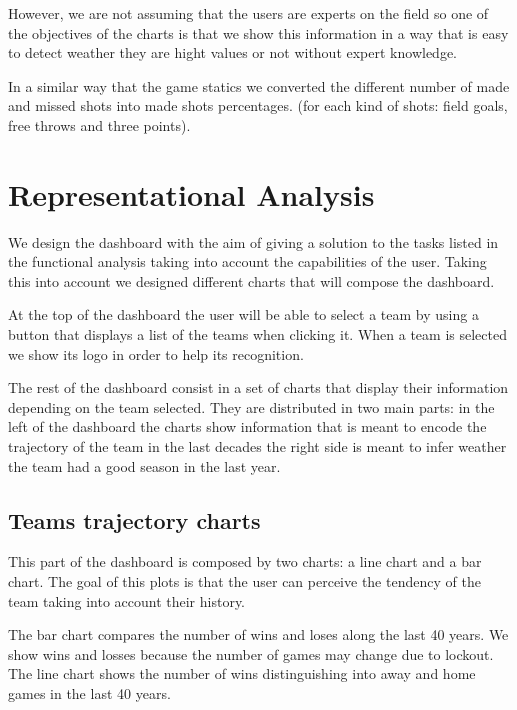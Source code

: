 \documentclass[11pt, a4paper]{article}
\begin{document}
However, we are not assuming that the users are experts on the field so one of the objectives of the charts is that we show this information in a way that is easy to detect weather they are hight values or not without expert knowledge.

\medskip

In a similar way that the game statics we converted the different number of made and missed shots into made shots percentages. (for each kind of shots: field goals, free throws and three points).






\section{Representational Analysis}

We design the dashboard with the aim of giving a solution to  the tasks listed in the functional analysis taking into account the capabilities of the user. Taking this into account we designed different charts that will compose the dashboard.
\medskip

At the top of the dashboard the user will be able to select a team by using a button that displays a list of the teams when clicking it. When a team is selected we show its logo in order to help its recognition.

The rest of the dashboard consist in a set of charts that display their information depending on the team selected. They are distributed in two main parts: in the left of the dashboard the charts show information that is meant to encode the trajectory of the team in the last decades the right side is meant to infer weather the team had a good season in the last year.
 
\subsection{Teams trajectory charts}

This part of the dashboard is composed by two charts: a line chart and a bar chart. The goal of this plots is that the user can perceive the tendency of the team taking into account their history.

\medskip
The bar chart compares the number of wins and loses along the last 40 years. We show wins and losses because the number of games may change due to lockout. The line chart shows the number of wins distinguishing into away and home games in the last 40 years.
\end{document}
